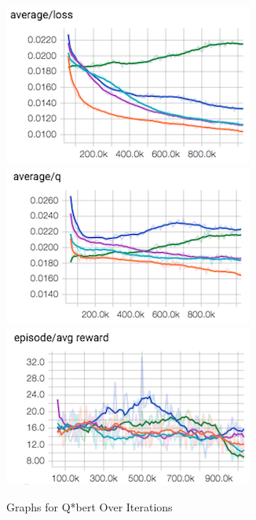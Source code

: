 \documentclass{article}
\begin{document}
\begin{figure}[h]
    \centering
    \begin{minipage}{1.0\textwidth}
        \centering
        \includegraphics[scale=0.4]{avg_loss}
        \centering
        \includegraphics[scale=0.4]{avg_q}
        \centering
        \includegraphics[scale=0.4]{episode_avg_reward}
    \end{minipage}
    \caption{Graphs for Q*bert Over Iterations}
\end{figure}
\end{document}
